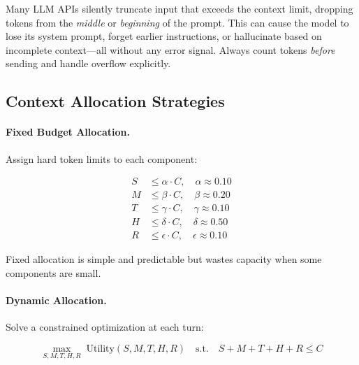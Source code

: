 \begin{warningbox}
Many LLM APIs silently truncate input that exceeds the context limit, dropping tokens from the \emph{middle} or \emph{beginning} of the prompt. This can cause the model to lose its system prompt, forget earlier instructions, or hallucinate based on incomplete context---all without any error signal. Always count tokens \emph{before} sending and handle overflow explicitly.
\end{warningbox}

\subsection{Context Allocation Strategies}
\label{context-allocation-strategies}

\paragraph{Fixed Budget Allocation.}
\label{fixed-budget-allocation.}

Assign hard token limits to each component:

\begin{equation}
\label{eq:fixed-budget}
\begin{aligned}
S &\leq \alpha \cdot C, \quad \alpha \approx 0.10 \\
M &\leq \beta \cdot C,  \quad \beta \approx 0.20 \\
T &\leq \gamma \cdot C, \quad \gamma \approx 0.10 \\
H &\leq \delta \cdot C, \quad \delta \approx 0.50 \\
R &\leq \epsilon \cdot C, \quad \epsilon \approx 0.10
\end{aligned}
\end{equation}

Fixed allocation is simple and predictable but wastes capacity when some components are small.

\paragraph{Dynamic Allocation.}
\label{dynamic-allocation.}

Solve a constrained optimization at each turn:

\begin{equation}
\max_{S, M, T, H, R} \; \text{Utility}(S, M, T, H, R) \quad \text{s.t.} \quad S + M + T + H + R \leq C
\end{equation}

